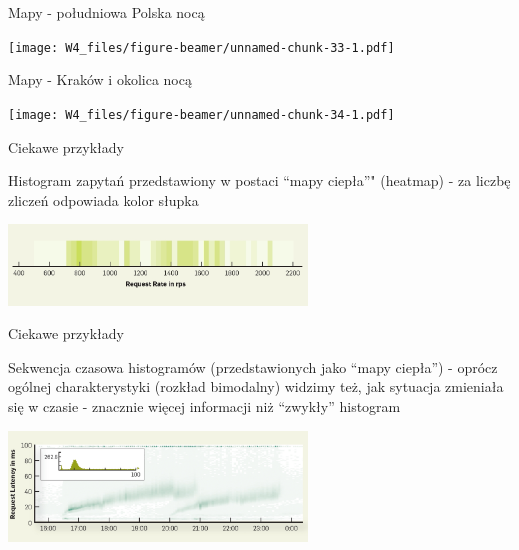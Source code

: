 \documentclass[ignorenonframetext,]{beamer}
\begin{document}
\begin{frame}{Mapy - południowa Polska nocą}

\texttt{[image: W4\_files/figure-beamer/unnamed-chunk-33-1.pdf]}

\end{frame}

\begin{frame}{Mapy - Kraków i okolica nocą}

\texttt{[image: W4\_files/figure-beamer/unnamed-chunk-34-1.pdf]}

\end{frame}

\begin{frame}{Ciekawe przykłady}

Histogram zapytań przedstawiony w postaci ``mapy ciepła''" (heatmap) -
za liczbę zliczeń odpowiada kolor słupka

\begin{center}\includegraphics[width=300px]{images/rr_heatmap_hist} \end{center}

\end{frame}

\begin{frame}{Ciekawe przykłady}

Sekwencja czasowa histogramów (przedstawionych jako ``mapy ciepła'') -
oprócz ogólnej charakterystyki (rozkład bimodalny) widzimy też, jak
sytuacja zmieniała się w czasie - znacznie więcej informacji niż
``zwykły'' histogram

\begin{center}\includegraphics[width=300px]{images/r_latency} \end{center}

\end{frame}
\end{document}

